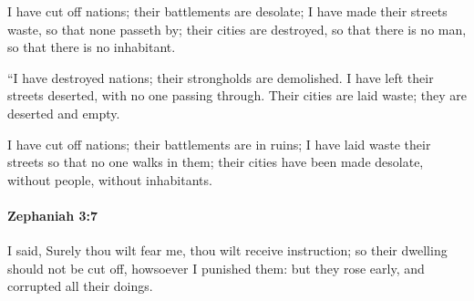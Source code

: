 			\begin{versebox}
					\item[BHS] 
					\item[LXX] 
					\item[ASV] I have cut off nations; their battlements are desolate; I have made their streets waste, so that none passeth by; their cities are destroyed, so that there is no man, so that there is no inhabitant.
					\item[NIV] “I have destroyed nations; their strongholds are demolished. I have left their streets deserted, with no one passing through. Their cities are laid waste; they are deserted and empty.
					\item[NRSV] I have cut off nations; their battlements are in ruins; I have laid waste their streets so that no one walks in them; their cities have been made desolate, without people, without inhabitants.
			\end{versebox}

		\paragraph{Zephaniah 3:7} %
			\label{ZEPHANIAH-3-7}

			I said, Surely thou wilt fear me, thou wilt receive instruction; so their dwelling should not be cut off, howsoever I punished them: but they rose early, and corrupted all their doings.

